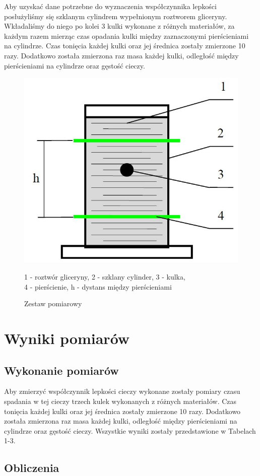 \documentclass[polish, 11pt, a4paper]{article}
\begin{document}
		Aby uzyskać dane potrzebne do wyznaczenia współczynnika lepkości posłużyliśmy się szklanym cylindrem wypełnionym roztworem gliceryny. Wkładaliśmy do niego po kolei 3 kulki wykonane z różnych materiałów, za każdym razem mierząc czas opadania kulki między zaznaczonymi pierścieniami na cylindrze. Czas tonięcia każdej kulki oraz jej średnica zostały zmierzone 10 razy. Dodatkowo została zmierzona raz masa każdej kulki, odległość między pierścieniami na cylindrze oraz gęstość cieczy.
		\begin{figure}[h]
			\centering
			\includegraphics[width=.5\linewidth]{Fiz8Rys}
			\caption{Zestaw pomiarowy}
			\vspace{.25cm}
			1 - roztwór gliceryny, 2 - szklany cylinder, 3 - kulka,\\
			4 - pierścienie, h - dystans między pierścieniami
		\end{figure}
	\section{Wyniki pomiarów}
		
	\subsection{Wykonanie pomiarów}
		Aby zmierzyć współczynnik lepkości cieczy wykonane zostały pomiary czasu spadania w tej cieczy trzech kulek wykonanych z różnych materiałów. Czas tonięcia każdej kulki oraz jej średnica zostały zmierzone 10 razy. Dodatkowo została zmierzona raz masa każdej kulki, odległość między pierścieniami na cylindrze oraz gęstość cieczy. Wszystkie wyniki zostały przedstawione w Tabelach 1-3.
	\subsection{Obliczenia}
\end{document}
